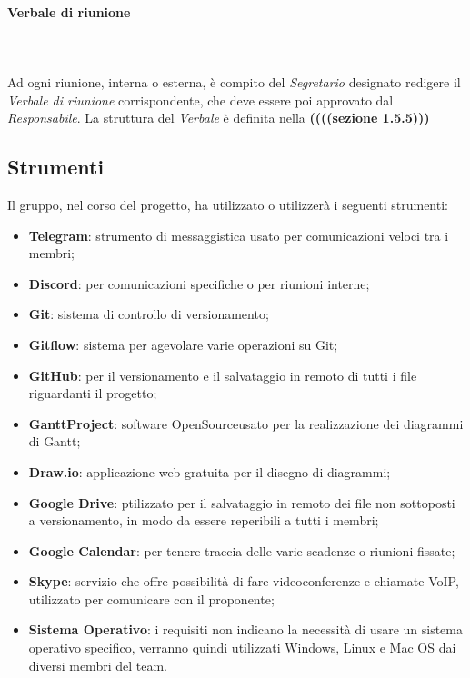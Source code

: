 \paragraph{Verbale di riunione} \mbox{} \\ \mbox{} \\
Ad ogni riunione, interna o esterna, è compito del \textit{Segretario} designato redigere il \textit{Verbale di riunione} corrispondente, che deve essere poi approvato dal \textit{Responsabile}. La struttura del \textit{Verbale} è definita nella \textbf{((((sezione 1.5.5)))}


\subsection{Strumenti}
Il gruppo, nel corso del progetto, ha utilizzato o utilizzerà i seguenti strumenti:
\begin{itemize}
	\item \textbf{Telegram}: strumento di messaggistica usato per comunicazioni veloci tra i membri; 
	\item \textbf{Discord}: per comunicazioni specifiche o per riunioni interne;
	\item \textbf{Git}: sistema di controllo di versionamento;
	\item \textbf{Gitflow}: sistema per agevolare varie operazioni su Git;
	\item \textbf{GitHub}: per il versionamento e il salvataggio in remoto di tutti i file riguardanti il progetto;
	\item \textbf{GanttProject}: software OpenSource\glo usato per la realizzazione dei diagrammi di Gantt;
	\item \textbf{Draw.io}: applicazione web gratuita per il disegno di diagrammi;
	\item \textbf{Google Drive}: ptilizzato per il salvataggio in remoto dei file non sottoposti a versionamento, in modo da essere reperibili a tutti i membri;
	\item \textbf{Google Calendar}: per tenere traccia delle varie scadenze o riunioni fissate;
	\item \textbf{Skype}: servizio che offre possibilità di fare videoconferenze e chiamate VoIP, utilizzato per comunicare con il proponente;
	\item \textbf{Sistema Operativo}: i requisiti non indicano la necessità di usare un sistema operativo specifico, verranno quindi utilizzati Windows, Linux e Mac OS dai diversi membri del team.
\end{itemize}